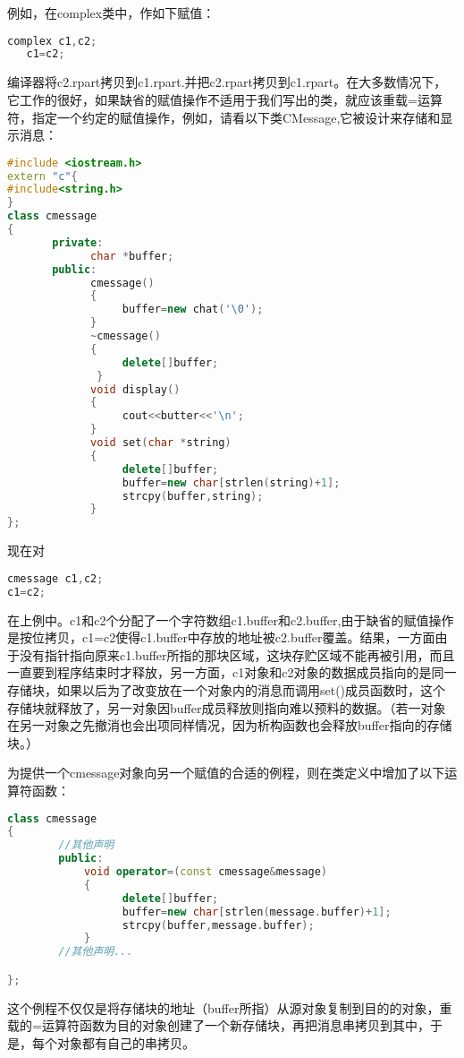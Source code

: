 \documentclass{article}
\begin{document}
例如，在complex类中，作如下赋值：
\begin{lstlisting}[language=c++]
   complex c1,c2;
   c1=c2;
\end{lstlisting}
编译器将c2.rpart拷贝到c1.rpart.并把c2.rpart拷贝到c1.rpart。在大多数情况下，它工作的很好，如果缺省的赋值操作不适用于我们写出的类，就应该重载=运算符，指定一个约定的赋值操作，例如，请看以下类CMessage,它被设计来存储和显示消息：
\begin{lstlisting}[language=c++]
#include <iostream.h>
extern "c"{
#include<string.h>
}
class cmessage
{
       private:
             char *buffer;
       public:
             cmessage()
             {
                  buffer=new chat('\0');
             }
             ~cmessage()
             {
                  delete[]buffer;
              }
             void display()
             {
                  cout<<butter<<'\n';
             }
             void set(char *string)
             {
                  delete[]buffer;
                  buffer=new char[strlen(string)+1];
                  strcpy(buffer,string);
             }
};
\end{lstlisting}
现在对
\begin{lstlisting}[language=c++]
cmessage c1,c2;
c1=c2;
\end{lstlisting}
在上例中。c1和c2个分配了一个字符数组c1.buffer和c2.buffer,由于缺省的赋值操作是按位拷贝，c1=c2使得c1.buffer中存放的地址被c2.buffer覆盖。结果，一方面由于没有指针指向原来c1.buffer所指的那块区域，这块存贮区域不能再被引用，而且一直要到程序结束时才释放，另一方面，c1对象和c2对象的数据成员指向的是同一存储块，如果以后为了改变放在一个对象内的消息而调用set()成员函数时，这个存储块就释放了，另一对象因buffer成员释放则指向难以预料的数据。（若一对象在另一对象之先撤消也会出项同样情况，因为析构函数也会释放buffer指向的存储块。）

为提供一个cmessage对象向另一个赋值的合适的例程，则在类定义中增加了以下运算符函数：
\begin{lstlisting}[language=c++]
class cmessage
{
        //其他声明
        public:
            void operator=(const cmessage&message)
            {
                  delete[]buffer;
                  buffer=new char[strlen(message.buffer)+1];
                  strcpy(buffer,message.buffer);
            }
        //其他声明...

};
\end{lstlisting}
这个例程不仅仅是将存储块的地址（buffer所指）从源对象复制到目的的对象，重载的=运算符函数为目的对象创建了一个新存储块，再把消息串拷贝到其中，于是，每个对象都有自己的串拷贝。
\end{document}
